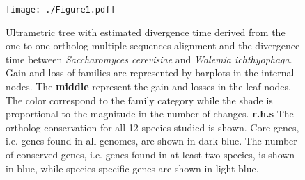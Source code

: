 \documentclass[fontsize=10pt, paper=a4,fleqn, ]{wlscirep}
\newif\ifcode
\newcommand{\walIch}{\textit{Walemia ichthyophaga}}
\newcommand{\sacCer}{\textit{Saccharomyces cerevisiae}}
\begin{document}
\begin{figure}[!h]
  \centering
  \texttt{[image: ./Figure1.pdf]}
  \caption{\label{fig:gainLossTree} Ultrametric tree with estimated
    divergence time derived from the one-to-one ortholog multiple
    sequences alignment and the divergence time between {\sacCer} and
    {\walIch}. Gain and loss of families are represented by barplots
    in the internal nodes. The \textbf{middle} represent the gain and
    losses in the leaf nodes. The color correspond to the family
    category while the shade is proportional to the magnitude in the
    number of changes. \textbf{r.h.s} The ortholog conservation for
    all 12  species studied is shown. Core genes, i.e. genes found in
    all genomes, are shown in dark blue. The number of conserved
    genes, i.e. genes found in at least two species, is shown in blue,
    while species specific genes are shown in light-blue.
  } 
\end{figure}




\ifcode
\begin{listing}
  \mint[breaklines,bgcolor=black,formatcom=\color{white},fontsize=\footnotesize]{shell}{
    cat myproject.proteinortho | perl -lane 'if($F[0]==12 &&
    ($F[1]==13 || $F[1]==12) && $F[2]==1){print;}'  | grep ,HOR  | sed -r 's/,HOR[^\t]+//g' > oneToOne.csv
    cat oneToOne.csv | perl ./generateAlignmentInput.pl -d . > oneToOneHomolog.phy 
    /home/htafer/bin/iqtree-omp-1.4.4-Linux/bin/iqtree-omp -s oneToOneHomolog.phy -m TEST -alrt 1000 -bb 1000 -nt 3
    #Tree was then created with evolgenius
  }
  \label{code:generatePhyloTree}
  \caption{shell command used to compute phylogenetic tree}
\end{listing}
\fi
\end{document}
